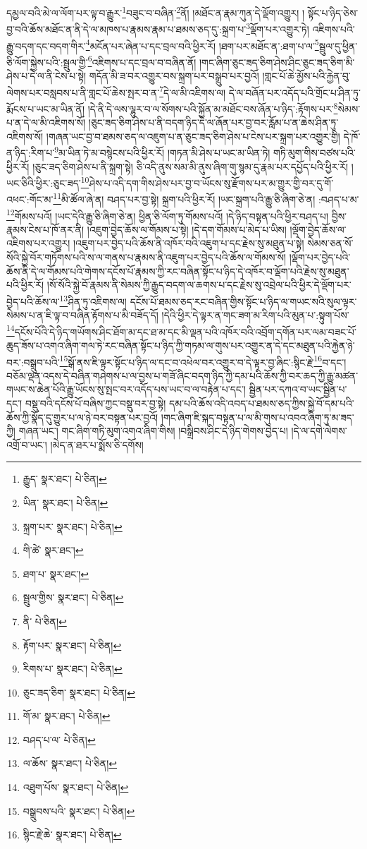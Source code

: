 དམྱལ་བའི་མེ་ལ་ལོག་པར་ལྟ་བ་རྒྱུར་\footnote{རྒྱུད་  སྣར་ཐང་།  པེ་ཅིན། }བཟུང་བ་བཞིན་\footnote{ཡིན་  སྣར་ཐང་།  པེ་ཅིན། }ནོ། །མཐོང་ན་རྣམ་ཀུན་དེ་ལྡོག་འགྱུར། །
སྟོང་པ་ཉིད་ཅེས་བྱ་བའི་ཆོས་མཐོང་ན་ནི་དེ་ལ་མཁས་པ་རྣམས་རྣམ་པ་ཐམས་ཅད་དུ་:སྐྲག་པ་\footnote{སྐྲག་པར་  སྣར་ཐང་།  པེ་ཅིན། }ལྡོག་པར་འགྱུར་ཏེ། འཇིགས་པའི་རྒྱུ་བདག་དང་བདག་གིར་\footnote{གི་ཚེ་  སྣར་ཐང་། }མངོན་པར་ཞེན་པ་དང་བྲལ་བའི་ཕྱིར་རོ། །ཐག་པར་མཐོང་ན་:ཐག་པ་ལ་\footnote{ཐག་པ་  སྣར་ཐང་། }སྦྲུལ་དུ་ཕྱིན་ཅི་ལོག་སྐྱེས་པའི་:སྦྲུལ་གྱི་\footnote{སྦྲུལ་གྱིས་  སྣར་ཐང་།  པེ་ཅིན། }འཇིགས་པ་དང་བྲལ་བ་བཞིན་ནོ། །གང་ཞིག་ཅུང་ཟད་ཅིག་ཤེས་ཤིང་ཅུང་ཟད་ཅིག་མི་ཤེས་པ་དེ་ལ་ནི་ངེས་པ་སྟེ། གདོན་མི་ཟ་བར་འགྱུར་བས་སྐྲག་པར་བསྒྲུབ་པར་བྱའོ། །གླང་པོ་ཆེ་མྱོས་པའི་རྐྱེན་བུ་ལེགས་པར་བསླབས་པ་ནི་གླང་པོ་ཆེས་སྤར་བ་ན་\footnote{ནི་  པེ་ཅིན། }དེ་ལ་མི་འཇིགས་ལ། དེ་ལ་བཞོན་པར་འདོད་པའི་གྲོང་པ་ཤིན་ཏུ་རྨོངས་པ་ཡང་མ་ཡིན་ནོ། །དེ་ནི་དེ་ལས་ལྷུར་བ་ལ་སོགས་པའི་སྐྱོན་མ་མཐོང་བས་ཞོན་པ་ཉིད་:རྟོགས་པར་\footnote{རྟོག་པར་  སྣར་ཐང་།  པེ་ཅིན། }སེམས་པ་ན་དེ་ལ་མི་འཇིགས་སོ། །ཅུང་ཟད་ཅིག་ཤེས་པ་ནི་བདག་ཉིད་དེ་ལ་ཞོན་པར་བྱ་བར་རློམ་པ་ན་ཆེས་ཤིན་ཏུ་འཇིགས་སོ། །གཞན་ཡང་བྱ་བ་ཐམས་ཅད་ལ་འཇུག་པ་ན་ཅུང་ཟད་ཅིག་ཤེས་པ་ངེས་པར་སྐྲག་པར་འགྱུར་གྱི། དེ་ཁོ་ན་ཉིད་:རིག་པ་\footnote{རིགས་པ་  སྣར་ཐང་།  པེ་ཅིན། }མ་ཡིན་ཏེ་མ་བསྙེངས་པའི་ཕྱིར་རོ། །གཏན་མི་ཤེས་པ་ཡང་མ་ཡིན་ཏེ། གཏི་མུག་གིས་བཙས་པའི་ཕྱིར་རོ། །ཅུང་ཟད་ཅིག་ཤེས་པ་ནི་སྐྲག་སྟེ། ཅི་འདི་ནུས་སམ་མི་ནུས་ཞིག་གུ་སྙམ་དུ་རྣམ་པར་དཔྱོད་པའི་ཕྱིར་རོ། །ཡང་ཅིའི་ཕྱིར་:ཅུང་ཟད་\footnote{ཅུང་ཟད་ཅིག་  སྣར་ཐང་།  པེ་ཅིན། }ཤེས་པ་འདི་དག་གིས་ཤེས་པར་བྱ་བ་ཡོངས་སུ་རྫོགས་པར་མ་གྱུར་གྱི་བར་དུ་གོ་འཕང་:གོང་མ་\footnote{གོ་མ་  སྣར་ཐང་།  པེ་ཅིན། }མི་ཚོལ་ཞེ་ན། བཤད་པར་བྱ་སྟེ། སྐྲག་པའི་ཕྱིར་རོ། །ཡང་སྐྲག་པའི་རྒྱུ་ཅི་ཞིག་ཅེ་ན། :བཤད་པ་མ་\footnote{བཤད་པ་ལ་  པེ་ཅིན། }གོམས་པའོ། །ཡང་དེའི་རྒྱུ་ཅི་ཞིག་ཅེ་ན། ཕྱིན་ཅི་ལོག་ཏུ་གོམས་པའོ། །དེ་ཉིད་བསྟན་པའི་ཕྱིར་བཤད་པ། བྱིས་རྣམས་ངེས་པ་ཁོ་ནར་ནི། །འཇུག་བྱེད་ཆོས་ལ་གོམས་པ་སྟེ། །དེ་དག་གོམས་པ་མེད་པ་ཡིས། །ལྡོག་བྱེད་ཆོས་ལ་འཇིགས་པར་འགྱུར། །འཇུག་པར་བྱེད་པའི་ཆོས་ནི་འཁོར་བའི་འཇུག་པ་དང་རྗེས་སུ་མཐུན་པ་སྟེ། སེམས་ཅན་སོ་སོའི་སྐྱེ་བོར་གཏོགས་པའི་ས་ལ་གནས་པ་རྣམས་ནི་འཇུག་པར་བྱེད་པའི་ཆོས་ལ་གོམས་སོ། །ལྡོག་པར་བྱེད་པའི་ཆོས་ནི་དེ་ལ་གོམས་པའི་གེགས་དངོས་པོ་རྣམས་ཀྱི་རང་བཞིན་སྟོང་པ་ཉིད་དེ་འཁོར་བ་ལྡོག་པའི་རྗེས་སུ་མཐུན་པའི་ཕྱིར་རོ། །སོ་སོའི་སྐྱེ་བོ་རྣམས་ནི་སེམས་ཀྱི་རྒྱུད་བདག་ལ་ཆགས་པ་དང་རྗེས་སུ་འབྲེལ་པའི་ཕྱིར་དེ་ལྡོག་པར་བྱེད་པའི་ཆོས་ལ་\footnote{ལ་ཆོས་  སྣར་ཐང་།  པེ་ཅིན། }ཤིན་ཏུ་འཇིགས་ལ། དངོས་པོ་ཐམས་ཅད་རང་བཞིན་གྱིས་སྟོང་པ་ཉིད་ལ་གཡང་སའི་སུལ་ལྟར་སེམས་པ་ན་ཇི་ལྟ་བ་བཞིན་རྟོགས་པ་མི་བཟོད་དོ། །དེའི་ཕྱིར་དེ་ལྟར་ན་གང་ཟག་མ་རིག་པའི་མུན་པ་:སྟུག་པོས་\footnote{འཐུག་པོས་  སྣར་ཐང་།  པེ་ཅིན། }དངོས་པོའི་དེ་ཉིད་གཡོགས་ཤིང་ཐོག་མ་དང་ཐ་མ་དང་མི་ལྡན་པའི་འཁོར་བའི་འབྲོག་དགོན་པར་ལམ་བཟང་པོ་ཆུད་ཟོས་པ་འགའ་ཞིག་གལ་ཏེ་རང་བཞིན་སྟོང་པ་ཉིད་ཀྱི་གཏམ་ལ་གུས་པར་འགྱུར་ན་དེ་དང་མཐུན་པའི་རྐྱེན་ཉེ་བར་:བསྒྲུབ་པའི་\footnote{བསྒྲུབས་པའི་  སྣར་ཐང་།  པེ་ཅིན། }སྒོ་ནས་ཇི་ལྟར་སྟོང་པ་ཉིད་ལ་དང་བ་འཕེལ་བར་འགྱུར་བ་དེ་ལྟར་བྱ་ཞིང་:སྙིང་རྗེ་\footnote{སྙིང་རྗེ་ཆེ་  སྣར་ཐང་།  པེ་ཅིན། }བ་དང་། བཅོམ་ལྡན་འདས་དེ་བཞིན་གཤེགས་པ་ལ་བྱས་པ་གཟོ་ཞིང་བདག་ཉིད་ཀྱི་དམ་པའི་ཆོས་ཀྱི་བར་ཆད་ཀྱི་རྒྱུ་མཚན་གཡང་ས་ཆེན་པོའི་རྒྱུ་ཡོངས་སུ་སྤང་བར་འདོད་པས་ཡང་བ་ལ་བརྟེན་པ་དང་། སྦྱིན་པར་དཀའ་བ་ཡང་སྦྱིན་པ་དང་། བསྡུ་བའི་དངོས་པོ་བཞིས་ཀྱང་བསྡུ་བར་བྱ་སྟེ། དམ་པའི་ཆོས་འདི་འབད་པ་ཐམས་ཅད་ཀྱིས་སྐྱེ་བོ་དམ་པའི་ཆོས་ཀྱི་སྣོད་དུ་གྱུར་པ་ལ་ཉེ་བར་བསྟན་པར་བྱའོ། །གང་ཞིག་ཇི་སྐད་བསྟན་པ་ལ་མི་གུས་པ་འབའ་ཞིག་ཏུ་མ་ཟད་ཀྱི། གཞན་ཡང་། གང་ཞིག་གཏི་མུག་འགའ་ཞིག་གིས། །བསྒྲིབས་ཤིང་དེ་ཉིད་གེགས་བྱེད་པ། །དེ་ལ་དགེ་ལེགས་འགྲོ་བ་ཡང་། །མེད་ན་ཐར་པ་སྨོས་ཅི་དགོས། 